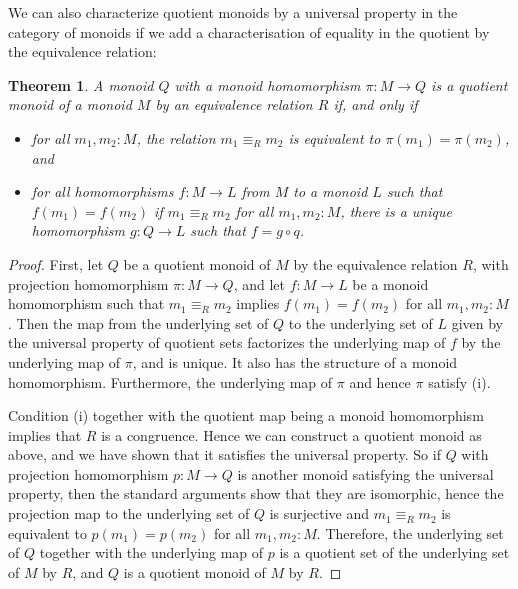 \documentclass{amsart}
\theoremstyle{plain}
\newtheorem{thm}{Theorem}[section]
\numberwithin{equation}{section} %
\numberwithin{figure}{section} %
\theoremstyle{plain}
\theoremstyle{plain}
\theoremstyle{plain}
\theoremstyle{plain}
\theoremstyle{plain}
\theoremstyle{plain}
\theoremstyle{remark}
\theoremstyle{remark}
\theoremstyle{remark}
\begin{document}
We can also characterize quotient monoids by a universal property in the category of monoids if we add a characterisation of equality in the quotient by the equivalence relation:
\begin{thm}  \label{univ-monoid-quot-thm}%
A monoid $Q$ with a monoid homomorphism $\pi : M \rightarrow Q$ is a quotient monoid of a monoid $M$ by an equivalence relation $R$ if, and only if
\begin{itemize} 
\item[(i)] for all $m_1, m_2 : M$, the relation $m_1 \equiv_R m_2$ is equivalent to $\pi(m_1) = \pi(m_2)$, and
\item[(ii)] for all homomorphisms $f : M \rightarrow L$ from $M$ to a monoid $L$ such that $f(m_1) = f(m_2)$ if $m_1 \equiv_R m_2$ for all $m_1, m_2 : M$, there is a unique homomorphism $g : Q \rightarrow L$ such that $f = g \circ q$.
\end{itemize}
\end{thm}
\begin{proof}
First, let $Q$ be a quotient monoid of $M$ by the equivalence relation $R$, with projection homomorphism $\pi : M \rightarrow Q$, and let $f : M \rightarrow L$ be a monoid homomorphism such that $m_1 \equiv_R m_2$ implies $f(m_1) = f(m_2)$ for all $m_1, m_2 : M$. Then the map from the underlying set of $Q$ to the underlying set of $L$ given by the universal property of quotient sets factorizes the underlying map of $f$ by the underlying map of $\pi$, and is unique. It also has the structure of a monoid homomorphism. Furthermore, the underlying map of $\pi$ and hence $\pi$ satisfy (i).

Condition (i) together with the quotient map being a monoid homomorphism implies that $R$ is a congruence. Hence we can construct a quotient monoid as above, and we have shown that it satisfies the universal property. So if $Q$ with projection homomorphism $p : M \rightarrow Q$ is another monoid satisfying the universal property, then the standard arguments show that they are isomorphic, hence the projection map to the underlying set of $Q$ is surjective and $m_1 \equiv_R m_2$ is equivalent to $p(m_1) = p(m_2)$ for all $m_1, m_2 : M$. Therefore, the underlying set of $Q$ together with the underlying map of $p$ is a quotient set of the underlying set of $M$ by $R$, and $Q$ is a quotient monoid of $M$ by $R$.
\end{proof}
\end{document}
